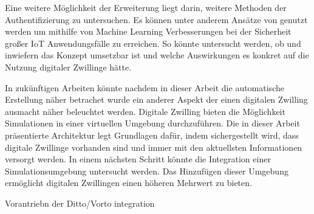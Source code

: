 \documentclass[
	12pt,
	BCOR=5mm,
	DIV=12,
	headinclude=on,
	footinclude=off,
	parskip=half,
	bibliography=totoc,
	listof=entryprefix,
	toc=listof,
	numbers=noenddot,
	plainfootsepline
]{scrreprt}
\begin{document}
Eine weitere Möglichkeit der Erweiterung liegt darin, weitere Methoden der Authentifizierung zu untersuchen. Es können unter anderem Ansätze von \citeauthor{fang2020fast} genutzt werden um mithilfe von Machine Learning Verbesserungen bei der Sicherheit großer IoT Anwendungsfälle zu erreichen. \autocite{fang2020fast} So könnte untersucht werden, ob und inwiefern das Konzept umsetzbar ist und welche Auswirkungen es konkret auf die Nutzung digitaler Zwillinge hätte. 

In zukünftigen Arbeiten könnte nachdem in dieser Arbeit die automatische Erstellung näher betrachet wurde ein anderer Aspekt der einen digitalen Zwilling ausmacht näher beleuchtet werden. Digitale Zwilling bieten die Möglichkeit Simulationen in einer virtuellen Umgebung durchzuführen. Die in dieser Arbeit präsentierte Architektur legt Grundlagen dafür, indem sichergestellt wird, dass digitale Zwillinge vorhanden sind und immer mit den aktuellsten Informationen versorgt werden. In einem nächsten Schritt könnte die Integration einer Simulationsumgebung untersucht werden. Das Hinzufügen dieser Umgebung ermöglicht digitalen Zwillingen einen höheren Mehrwert zu bieten.

Vorantriebn der Ditto/Vorto integration

\clearpage
\ihead{}
\printbibliography[title=Literaturverzeichnis]
\cleardoublepage

\end{document}
